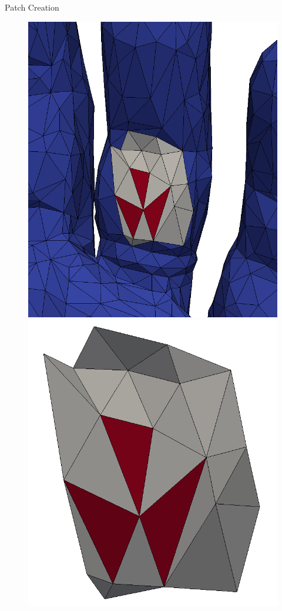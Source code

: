 \documentclass{beamer}
\begin{document}
\begin{frame}[plain]{Patch Creation}
\begin{figure}
\begin{minipage}{0.24\textwidth}
      \includegraphics[width=1\linewidth]{../image/patch1.png}
    \end{minipage}
    \begin{minipage}{.24\textwidth}
      \centering
      \includegraphics[width=1\linewidth]{../image/patch2.png}

\end{minipage}
\end{figure}
\end{frame}
\end{document}
